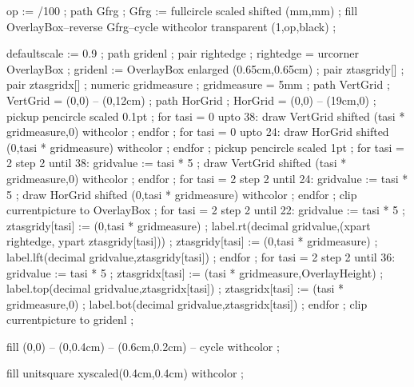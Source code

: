op := /100 ;
path Gfrg ;
Gfrg := fullcircle scaled  shifted (mm,mm) ;
fill OverlayBox--reverse Gfrg--cycle withcolor transparent (1,op,black) ;
\stopuseMPgraphic

defaultscale := 0.9 ;
path gridenl ;
pair rightedge ; rightedge = urcorner OverlayBox ;
gridenl := OverlayBox enlarged (0.65cm,0.65cm) ;
pair ztasgridy[] ; 
pair ztasgridx[] ;
numeric gridmeasure ; gridmeasure = 5mm ;
path VertGrid ; VertGrid = (0,0) -- (0,12cm) ;
path HorGrid ; HorGrid = (0,0) -- (19cm,0) ;
pickup pencircle scaled 0.1pt ;
for tasi = 0 upto 38:
	draw VertGrid shifted (tasi * gridmeasure,0) withcolor  ;
endfor ;
for tasi = 0 upto 24:
	draw HorGrid shifted (0,tasi * gridmeasure) withcolor  ;
endfor ;
pickup pencircle scaled 1pt ;
for tasi = 2 step 2 until 38:
	gridvalue := tasi * 5 ;
	draw VertGrid shifted (tasi * gridmeasure,0) withcolor  ;
endfor ;
for tasi = 2 step 2 until 24:
	gridvalue := tasi * 5 ;
	draw HorGrid shifted (0,tasi * gridmeasure) withcolor  ;
endfor ;
clip currentpicture to OverlayBox ;
for tasi = 2 step 2 until 22:
 	gridvalue := tasi * 5 ;
 	ztasgridy[tasi] := (0,tasi * gridmeasure) ;
 	label.rt(decimal gridvalue,(xpart rightedge, ypart ztasgridy[tasi])) ;
	ztasgridy[tasi] := (0,tasi * gridmeasure) ;
	label.lft(decimal gridvalue,ztasgridy[tasi]) ;
endfor ;
for tasi = 2 step 2 until 36:
  	gridvalue := tasi * 5 ;
	ztasgridx[tasi] := (tasi * gridmeasure,OverlayHeight) ;
	label.top(decimal gridvalue,ztasgridx[tasi]) ;
  	ztasgridx[tasi] := (tasi * gridmeasure,0) ;
  	label.bot(decimal gridvalue,ztasgridx[tasi]) ;
endfor ;
clip currentpicture to gridenl ;
\stopuseMPgraphic


  fill (0,0) -- (0,0.4cm) -- (0.6cm,0.2cm) -- cycle 
       withcolor  ;
\stopuniqueMPgraphic

  fill unitsquare xyscaled(0.4cm,0.4cm) 
       withcolor  ;
\stopuniqueMPgraphic


\protect

\stopmodule
